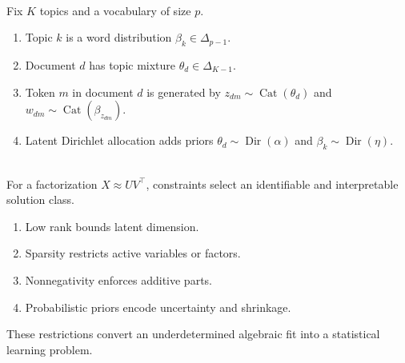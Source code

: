 \begin{definition} \label{def:sl-topic-model} \\
Fix $K$ topics and a vocabulary of size $p$.
\begin{enumerate}[label=(\roman*)]
\setlength{\itemsep}{0pt}
\item Topic $k$ is a word distribution $\beta_k\in\Delta_{p-1}$.
\item Document $d$ has topic mixture $\theta_d\in\Delta_{K-1}$.
\item Token $m$ in document $d$ is generated by $z_{dm}\sim\operatorname{Cat}(\theta_d)$ and $w_{dm}\sim\operatorname{Cat}(\beta_{z_{dm}})$.
\item Latent Dirichlet allocation adds priors $\theta_d\sim\operatorname{Dir}(\alpha)$ and $\beta_k\sim\operatorname{Dir}(\eta)$.
\end{enumerate}
\end{definition}

\begin{remark} \label{rem:sl-factorization-regularization} \\
For a factorization $X\approx UV^\top$, constraints select an identifiable and interpretable solution class.
\begin{enumerate}[label=(\roman*)]
\setlength{\itemsep}{0pt}
\item Low rank bounds latent dimension.
\item Sparsity restricts active variables or factors.
\item Nonnegativity enforces additive parts.
\item Probabilistic priors encode uncertainty and shrinkage.
\end{enumerate}
These restrictions convert an underdetermined algebraic fit into a statistical learning problem.
\end{remark}
